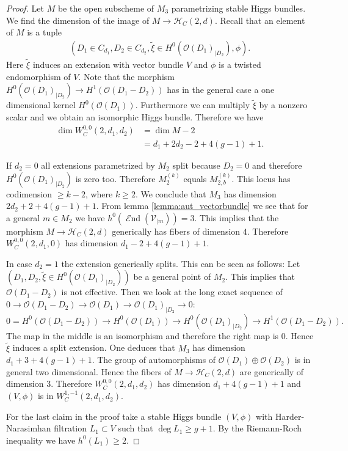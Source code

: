 \documentclass[10pt,a4paper]{amsart}
\DeclareMathOperator{\End}{\mathcal{E}nd}
\newcommand{\OO}{\mathcal{O}}
\newcommand{\cH}{\mathcal{H}}
\newcommand{\cV}{\mathcal{V}}
\renewcommand{\tilde}{\widetilde}		%
\begin{document}
\begin{proof}
Let $M$ be the open subscheme of $M_3$ parametrizing stable Higgs bundles. We find the dimension of the image of $M\to \cH_C(2,d)$. Recall that an element of $M$ is a tuple
\begin{align*}
(D_1\in C_{d_1},D_2\in C_{d_2},\tilde{\xi} \in H^0(\OO(D_1)_{|D_2}),\phi).
\end{align*}
Here $\tilde{\xi}$ induces an extension with vector bundle $V$ and $\phi$ is a twisted endomorphism of $V$. Note that the morphism $H^0(\OO(D_1)_{|D_2}) \to H^1(\OO(D_1-D_2))$ has in the general case a one dimensional kernel $H^0(\OO(D_1))$. Furthermore we can multiply $\tilde{\xi}$ by a nonzero scalar and we obtain an isomorphic Higgs bundle. Therefore we have 
\begin{align}\label{eq:dimension_0,0unstable}
\dim W_C^{0,0}(2,d_1,d_2) &= \dim M - 2 \\
&= d_1 + 2d_2 -2 + 4(g-1)+1.
\end{align}

If $d_2 = 0$ all extensions parametrized by $M_2$ split because $D_2 = 0$ and therefore $H^0(\OO(D_1)_{|D_2})$ is zero too. Therefore $M^{(k)}_{2}$ equals $M^{(k)}_{2,b}$. This locus has codimension $\geq k-2$, where $k \geq 2$. We conclude that $M_3$ has dimension ${2d_2 +2  +4(g-1)+1}$. From lemma \ref{lemma:aut_vectorbundle} we see that for a general $m\in M_2$ we have $h^0(\End(\cV_{|m})) = 3$. This implies that the morphism $M \to \cH_C(2,d)$ generically has fibers of dimension $4$. Therefore $W_C^{0,0}(2,d_1,0)$ has dimension $d_1 -2  + 4(g-1)+1$. 

In case $d_2 = 1$ the extension generically splits. This can be seen as follows: Let ${(D_1,D_2,\tilde{\xi} \in H^0(\OO(D_1)_{|D_2}))}$ be a general point of $M_2$. This implies that $\OO(D_1-D_2)$ is not effective. Then we look at the long exact sequence of $0 \to \OO(D_1-D_2) \to \OO(D_1) \to \OO(D_1)_{|D_2} \to 0$:
\begin{equation*}
0 = H^0(\OO(D_1-D_2)) \to H^0(\OO(D_1)) \to H^0(\OO(D_1)_{|D_2}) \to H^1(\OO(D_1-D_2)).
\end{equation*} 
The map in the middle is an isomorphism and therefore the right map is $0$. Hence $\tilde{\xi}$ induces a split extension. One deduces that $M_3$ has dimension ${d_1 + 3 + 4(g-1) +1 }$. The group of automorphisms of $\OO(D_1)\oplus \OO(D_2)$ is in general two dimensional. Hence the fibers of $M\to \cH_C(2,d)$ are generically of dimension $3$. Therefore $W_C^{0,0}(2,d_1,d_2)$ has dimension $d_1 + 4(g-1) +1$ and $(V,\phi)$ is in $W_C^{1,-1}(2,d_1,d_2)$. 

For the last claim in the proof take a stable Higgs bundle $(V,\phi)$ with Harder-Narasimhan filtration $L_1 \subset V$ such that $\deg L_1 \geq g+1$. By the Riemann-Roch inequality we have $h^0(L_1)\geq 2$.
\end{proof}
\end{document}
